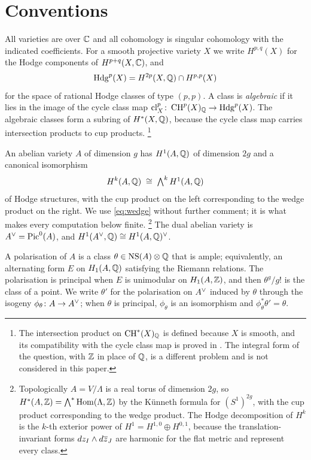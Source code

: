\section{Conventions}\label{sec:conventions}

All varieties are over $\mathbb{C}$ and all cohomology is singular cohomology with
the indicated coefficients. For a smooth projective variety $X$ we write
$H^{p,q}(X)$ for the Hodge components of $H^{p+q}(X,\mathbb{C})$, and
\[
  \mathrm{Hdg}^{p}(X)=H^{2p}(X,\mathbb{Q})\cap H^{p,p}(X)
\]
for the space of rational Hodge classes of type $(p,p)$. A class is
\emph{algebraic} if it lies in the image of the cycle class map
$\mathrm{cl}^{p}_{X}\colon\operatorname{CH}^{p}(X)_{\mathbb{Q}}\to\mathrm{Hdg}^{p}(X)$. The algebraic classes form
a subring of $H^{*}(X,\mathbb{Q})$, because the cycle class map carries intersection
products to cup products.%
\footnote{The intersection product on $\operatorname{CH}^{*}(X)_{\mathbb{Q}}$ is defined because
$X$ is smooth, and its compatibility with the cycle class map is proved in
\cite[Chapter~19]{Ful98}. The integral form of the question, with $\mathbb{Z}$ in
place of $\mathbb{Q}$, is a different problem and is not considered in this paper.}

An abelian variety $A$ of dimension $g$ has $H^{1}(A,\mathbb{Q})$ of dimension $2g$
and a canonical isomorphism
\begin{equation}\label{eq:wedge}
  H^{k}(A,\mathbb{Q})\;\cong\;\textstyle\bigwedge^{k}H^{1}(A,\mathbb{Q})
\end{equation}
of Hodge structures, with the cup product on the left corresponding to the
wedge product on the right. We use \eqref{eq:wedge} without further comment;
it is what makes every computation below finite.%
\footnote{Topologically $A=V/\Lambda$ is a real torus of dimension $2g$, so
$H^{*}(A,\mathbb{Z})=\bigwedge^{*}\operatorname{Hom}(\Lambda,\mathbb{Z})$ by the K\"unneth formula for
$(S^{1})^{2g}$, with the cup product corresponding to the wedge product. The
Hodge decomposition of $H^{k}$ is the $k$-th exterior power of
$H^{1}=H^{1,0}\oplus H^{0,1}$, because the translation-invariant forms
$dz_{I}\wedge d\overline{z}_{J}$ are harmonic for the flat metric and represent
every class.}
The dual abelian variety is $A^{\vee}=\operatorname{Pic}^{0}(A)$, and
$H^{1}(A^{\vee},\mathbb{Q})\cong H^{1}(A,\mathbb{Q})^{\vee}$.

A polarisation of $A$ is a class $\theta\in\mathrm{NS}(A)\otimes\mathbb{Q}$ that is ample;
equivalently, an alternating form $E$ on $H_{1}(A,\mathbb{Q})$ satisfying the Riemann
relations. The polarisation is principal when $E$ is unimodular on
$H_{1}(A,\mathbb{Z})$, and then $\theta^{g}/g!$ is the class of a point. We write
$\theta'$ for the polarisation on $A^{\vee}$ induced by $\theta$ through the
isogeny $\phi_{\theta}\colon A\to A^{\vee}$; when $\theta$ is principal,
$\phi_{\theta}$ is an isomorphism and $\phi_{\theta}^{*}\theta'=\theta$.

